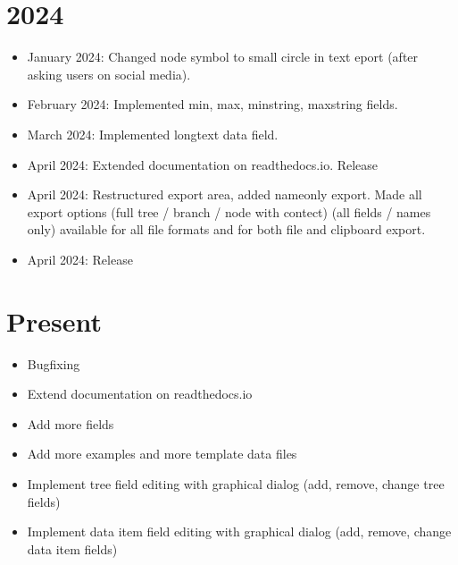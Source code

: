\documentclass[letterpaper,10pt,english]{sphinxmanual}
\begin{document}
\section{2024}
\label{\detokenize{releases:id10}}\begin{itemize}
\item {} 
\sphinxAtStartPar
January 2024: Changed node symbol to small circle in text eport (after asking users on social media).

\item {} 
\sphinxAtStartPar
February 2024: Implemented min, max, min\sphinxhyphen{}string, max\sphinxhyphen{}string fields.

\item {} 
\sphinxAtStartPar
March 2024: Implemented longtext data field.

\item {} 
\sphinxAtStartPar
April 2024: Extended documentation on readthedocs.io. Release 

\item {} 
\sphinxAtStartPar
April 2024: Restructured export area, added name\sphinxhyphen{}only export. Made all export options (full tree / branch / node with contect) (all fields / names only) available for all file formats and for both file and clipboard export.

\item {} 
\sphinxAtStartPar
April 2024: Release 

\end{itemize}


\section{Present}
\label{\detokenize{releases:present}}\begin{itemize}
\item {} 
\sphinxAtStartPar
Bugfixing

\item {} 
\sphinxAtStartPar
Extend documentation on readthedocs.io

\item {} 
\sphinxAtStartPar
Add more fields

\item {} 
\sphinxAtStartPar
Add more examples and more template data files

\item {} 
\sphinxAtStartPar
Implement tree field editing with graphical dialog (add, remove, change tree fields)

\item {} 
\sphinxAtStartPar
Implement data item field editing with graphical dialog (add, remove, change data item fields)

\end{itemize}
\end{document}

